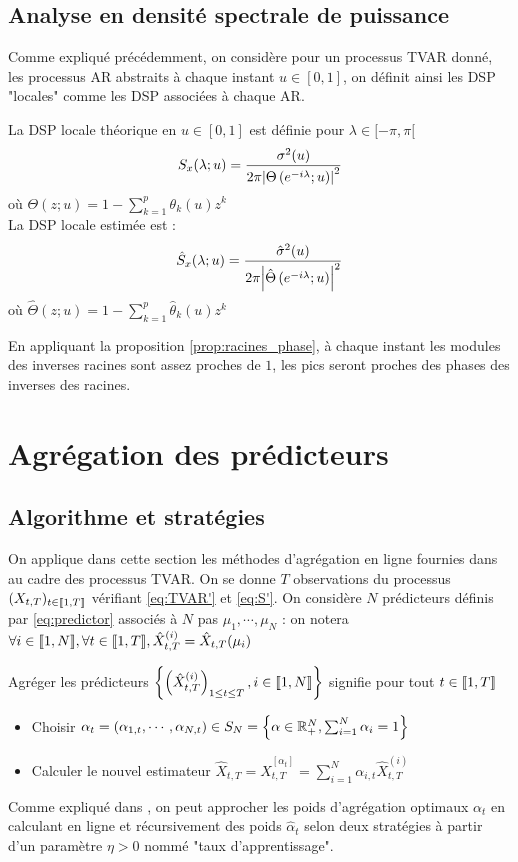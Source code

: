 \documentclass{report}
\begin{document}
\subsection{Analyse en densité spectrale de puissance}
Comme expliqué précédemment, on considère pour un processus TVAR donné, les processus AR abstraits à chaque instant $u\in [0,1]$, on définit ainsi les DSP "locales" comme les DSP associées à chaque AR.
\begin{Def}[DSP]
La DSP locale théorique en $u\in [0,1]$ est définie pour $\lambda \in [-\pi, \pi[$ 
$$
S_x(\lambda ; u) = \frac{\sigma^2(u)}{2\pi{ \left| \Theta\left( e^{-i\lambda} ; u \right) \right|}^2}
$$
où $\Theta(z;u) = 1 - \sum_{k=1}^p \theta_k(u) z^k$ \\
La DSP locale estimée est : 
$$
\hat{S}_x(\lambda ; u) = \frac{\hat{\sigma}^2(u)}{2\pi{ \left| \hat{\Theta}\left( e^{-i\lambda} ; u \right) \right|}^2}
$$
où $\hat{\Theta}(z;u) = 1 - \sum_{k=1}^p \hat{\theta}_k(u) z^k$
\end{Def}

En appliquant la proposition \ref{prop:racines_phase}, à chaque instant les modules des inverses racines sont assez proches de $1$, les pics seront proches des phases des inverses des racines.
\section{Agrégation des prédicteurs}
\subsection{Algorithme et stratégies}
On applique dans cette section les méthodes d'agrégation en ligne fournies dans \citep{giraud-roueff-sanchez-aos2015} au cadre des processus TVAR. On se donne $T$ observations du processus $(X_{t,T})_{t \in {\left\llbracket 1,T \right\rrbracket}}$ vérifiant \eqref{eq:TVAR'} et \eqref{eq:S'}. On considère $N$ prédicteurs définis par \eqref{eq:predictor} associés à $N$ pas $\mu_1, \cdots, \mu_N$ : on notera $\forall i \in {\left\llbracket 1,N \right\rrbracket}, \forall t \in {\left\llbracket 1,T \right\rrbracket}, \hat{X}_{t,T}^{(i)} = \hat{X}_{t,T}(\mu_i)$
\begin{Def}[Agrégation]
Agréger les prédicteurs ${ \left\lbrace \left(\hat{X}_{t,T}^{(i)}\right)_{1\leq t\leq T}, i\in {\left\llbracket 1,N \right\rrbracket} \right\rbrace }$ signifie pour tout $t\in {\left\llbracket 1,T \right\rrbracket}$
\begin{itemize}
\item Choisir $\alpha_t=(\alpha_{1,t},\cdots,\alpha_{N,t})\in S_N = { \left\lbrace \alpha \in \mathbb{R}_+^N, \sum_{i=1}^N \alpha_{i} = 1 \right\rbrace }$ 
\item Calculer le nouvel estimateur $\hat{X}_{t,T} = \hat{X}_{t,T}^{[\alpha_t]} = \sum_{i=1}^N \alpha_{i,t} \hat{X}_{t,T}^{(i)}$
\end{itemize}
\end{Def}
Comme expliqué dans \citep{giraud-roueff-sanchez-aos2015}, on peut approcher les poids d'agrégation optimaux $\alpha_t$ en calculant en ligne et récursivement des poids $\hat{\alpha}_t$ selon deux stratégies à partir d'un paramètre $\eta >0$ nommé "taux d'apprentissage". \\
\end{document}
